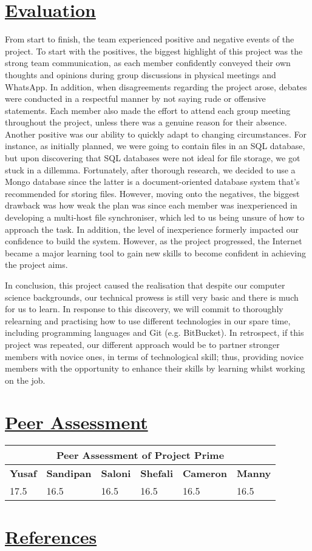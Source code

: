 \documentclass{article}
\begin{document}
\section{\underline{Evaluation}}
From start to finish, the team experienced  positive and negative events of the project. To start with the positives, the biggest highlight of this project was the strong team communication, as each member confidently conveyed their own thoughts and opinions during group discussions in physical meetings and WhatsApp. In addition, when disagreements regarding the project arose, debates were conducted in a respectful manner by not saying rude or offensive statements. Each member also made the effort to attend each group meeting throughout the project, unless there was a genuine reason for their absence. Another positive was our ability to quickly adapt to changing circumstances. For instance, as initially planned, we were going to contain files in an SQL database, but upon discovering that SQL databases were not ideal for file storage, we got stuck in a dillemma. Fortunately, after thorough research, we decided to use a Mongo database since the latter is a document-oriented database system that's recommended for storing files. However, moving onto the negatives, the biggest drawback was how weak the plan was since each member was inexperienced in developing a multi-host file synchroniser, which led to us being unsure of how to approach the task. In addition, the level of inexperience formerly impacted our confidence to build the system. However, as the project progressed, the Internet became a major learning tool to gain new skills to become confident in achieving the project aims.

In conclusion, this project caused the realisation that despite our computer science backgrounds, our technical prowess is still very basic and there is much for us to learn. In response to this discovery, we will commit to thoroughly relearning and practising how to use different technologies in our spare time, including programming languages and Git (e.g. BitBucket). In retrospect, if this project was repeated, our different approach would be to partner stronger members with novice ones, in terms of technological skill; thus, providing novice members with the opportunity to enhance their skills by learning whilst working on the job.   

\section{\underline{Peer Assessment}}
\begin{tabular}{|p{2cm}|p{2cm}|p{2cm}|p{2cm}|p{2cm}|p{2cm}|}
\hline
\multicolumn{6}{|c|}{\textbf{Peer Assessment of Project Prime}} \\
\hline
\textbf{Yusaf} & \textbf{Sandipan} & \textbf{Saloni} & \textbf{Shefali} & \textbf{Cameron} & \textbf{Manny} \\
\hline
17.5 & 16.5 & 16.5 & 16.5 & 16.5 & 16.5 \\
\hline
\end{tabular}
	
\section{\underline{References}}
\end{document}
